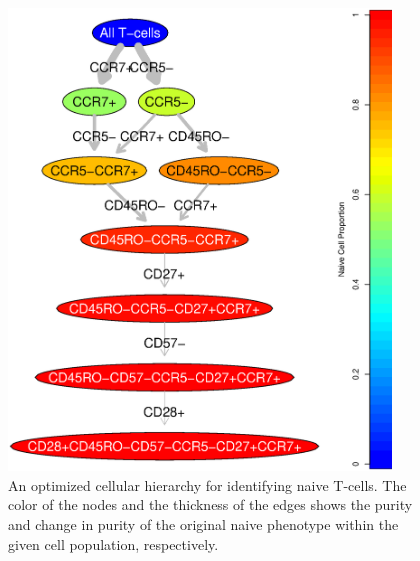 \begin{figure}[ht]
  \begin{center}
    \includegraphics[width=4in]{figs/rchy/NaiveOverlap}
  \end{center}
  \caption{An optimized cellular hierarchy for identifying naive T-cells. The color of the nodes and the thickness of the edges shows the purity and change in purity of the original naive phenotype within the given cell population, respectively.
  }
  \label{r1:NaiveOverlap}
\end{figure}



